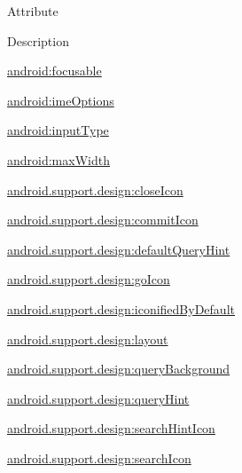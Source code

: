 Attribute

Description 

{\ttfamily \hyperlink{classandroid_1_1support_1_1design_1_1R_1_1styleable_a7ac28ac6ee547e469ab02402f744e213}{android\+:focusable}}

{\ttfamily \hyperlink{classandroid_1_1support_1_1design_1_1R_1_1styleable_af9de3573ac6e0e2c6743858a629db9e5}{android\+:ime\+Options}}

{\ttfamily \hyperlink{classandroid_1_1support_1_1design_1_1R_1_1styleable_ade6584fc0075b1b9f4eb7d962b817198}{android\+:input\+Type}}

{\ttfamily \hyperlink{classandroid_1_1support_1_1design_1_1R_1_1styleable_ab62fc7eb5b7b2bc25ef503ebe25dc42b}{android\+:max\+Width}}

{\ttfamily \hyperlink{classandroid_1_1support_1_1design_1_1R_1_1styleable_aa0a9fd15edd08df1deca5a77072d1fb5}{android.\+support.\+design\+:close\+Icon}}

{\ttfamily \hyperlink{classandroid_1_1support_1_1design_1_1R_1_1styleable_a9fa9a7e88b9b47cd40415ede8e02019d}{android.\+support.\+design\+:commit\+Icon}}

{\ttfamily \hyperlink{classandroid_1_1support_1_1design_1_1R_1_1styleable_a169926ffb29c292c78de7f9770a418e6}{android.\+support.\+design\+:default\+Query\+Hint}}

{\ttfamily \hyperlink{classandroid_1_1support_1_1design_1_1R_1_1styleable_a1ce6776217e2c2e3d29ecc0a70889b21}{android.\+support.\+design\+:go\+Icon}}

{\ttfamily \hyperlink{classandroid_1_1support_1_1design_1_1R_1_1styleable_a885ff4567a9e9b0a2f61d08d2b7e4a7d}{android.\+support.\+design\+:iconified\+By\+Default}}

{\ttfamily \hyperlink{classandroid_1_1support_1_1design_1_1R_1_1styleable_a508458355c8e4fb9a6661d806c0ec352}{android.\+support.\+design\+:layout}}

{\ttfamily \hyperlink{classandroid_1_1support_1_1design_1_1R_1_1styleable_a625f77d9f60563036744e0de3279d85b}{android.\+support.\+design\+:query\+Background}}

{\ttfamily \hyperlink{classandroid_1_1support_1_1design_1_1R_1_1styleable_a879468cbbd5600253d62fe8000d05975}{android.\+support.\+design\+:query\+Hint}}

{\ttfamily \hyperlink{classandroid_1_1support_1_1design_1_1R_1_1styleable_a9c896f5dd793d57c75958116ba69b26c}{android.\+support.\+design\+:search\+Hint\+Icon}}

{\ttfamily \hyperlink{classandroid_1_1support_1_1design_1_1R_1_1styleable_a4261289fdaf3e932d53a3c70b119b5bf}{android.\+support.\+design\+:search\+Icon}}


